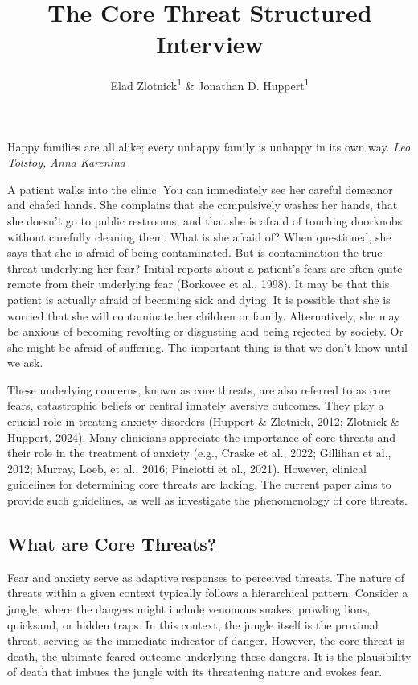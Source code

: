 \documentclass[
  man,floatsintext]{apa7}
\title{The Core Threat Structured Interview}
\author{Elad Zlotnick\textsuperscript{1} \& Jonathan D. Huppert\textsuperscript{1}}
\date{}
\affiliation{\vspace{0.5cm}\textsuperscript{1} The Hebrew University of Jerusalem}
\begin{document}
\maketitle

Happy families are all alike; every unhappy family is unhappy in its own way. \emph{Leo Tolstoy, Anna Karenina}

A patient walks into the clinic.
You can immediately see her careful demeanor and chafed hands.
She complains that she compulsively washes her hands, that she doesn't go to public restrooms, and that she is afraid of touching doorknobs without carefully cleaning them.
What is she afraid of?
When questioned, she says that she is afraid of being contaminated.
But is contamination the true threat underlying her fear?
Initial reports about a patient's fears are often quite remote from their underlying fear (Borkovec et al., 1998).
It may be that this patient is actually afraid of becoming sick and dying.
It is possible that she is worried that she will contaminate her children or family.
Alternatively, she may be anxious of becoming revolting or disgusting and being rejected by society.
Or she might be afraid of suffering.
The important thing is that we don't know until we ask.

These underlying concerns, known as core threats, are also referred to as core fears, catastrophic beliefs or central innately aversive outcomes.
They play a crucial role in treating anxiety disorders (Huppert \& Zlotnick, 2012; Zlotnick \& Huppert, 2024).
Many clinicians appreciate the importance of core threats and their role in the treatment of anxiety
(e.g., Craske et al., 2022; Gillihan et al., 2012; Murray, Loeb, et al., 2016; Pinciotti et al., 2021).
However, clinical guidelines for determining core threats are lacking.
The current paper aims to provide such guidelines, as well as investigate the phenomenology of core threats.

\subsection{What are Core Threats?}\label{what-are-core-threats}

Fear and anxiety serve as adaptive responses to perceived threats.
The nature of threats within a given context typically follows a hierarchical pattern.
Consider a jungle, where the dangers might include venomous snakes, prowling lions, quicksand, or hidden traps.
In this context, the jungle itself is the proximal threat, serving as the immediate indicator of danger.
However, the core threat is death, the ultimate feared outcome underlying these dangers.
It is the plausibility of death that imbues the jungle with its threatening nature and evokes fear.
\end{document}
